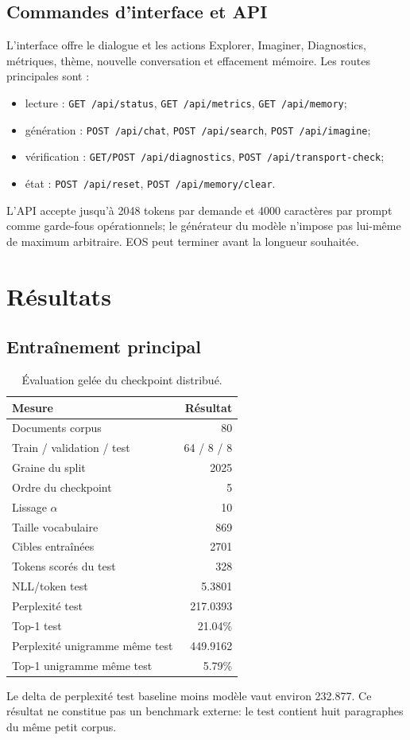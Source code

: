 \documentclass[11pt,a4paper]{article}
\begin{document}
\subsection{Commandes d'interface et API}
L'interface offre le dialogue et les actions Explorer, Imaginer, Diagnostics, métriques, thème, nouvelle conversation et effacement mémoire. Les routes principales sont :
\begin{itemize}[leftmargin=*,itemsep=1pt]
\item lecture : \texttt{GET /api/status}, \texttt{GET /api/metrics}, \texttt{GET /api/memory};
\item génération : \texttt{POST /api/chat}, \texttt{POST /api/search}, \texttt{POST /api/imagine};
\item vérification : \texttt{GET/POST /api/diagnostics}, \texttt{POST /api/transport-check};
\item état : \texttt{POST /api/reset}, \texttt{POST /api/memory/clear}.
\end{itemize}
L'API accepte jusqu'à 2048 tokens par demande et 4000 caractères par prompt comme garde-fous opérationnels; le générateur du modèle n'impose pas lui-même de maximum arbitraire. EOS peut terminer avant la longueur souhaitée.
\section{Résultats}
\subsection{Entraînement principal}
\begin{table}[h!]\centering\begin{tabular}{lr}\toprule Mesure & Résultat \\
\midrule Documents corpus & 80 \\
Train / validation / test & 64 / 8 / 8 \\
Graine du split & 2025 \\
Ordre du checkpoint & 5 \\
Lissage $\alpha$ & 10 \\
Taille vocabulaire & 869 \\
Cibles entraînées & 2701 \\
Tokens scorés du test & 328 \\
NLL/token test & 5.3801 \\
Perplexité test & 217.0393 \\
Top-1 test & 21.04\% \\
Perplexité unigramme même test & 449.9162 \\
Top-1 unigramme même test & 5.79\% \\
\bottomrule\end{tabular}\caption{Évaluation gelée du checkpoint distribué.}\end{table}
Le delta de perplexité test baseline moins modèle vaut environ 232.877. Ce résultat ne constitue pas un benchmark externe: le test contient huit paragraphes du même petit corpus.
\end{document}
